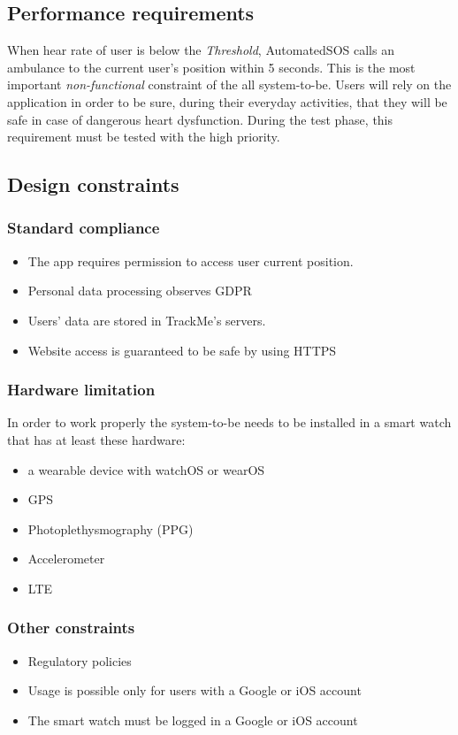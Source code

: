 \documentclass{article}
\begin{document}
\subsection{Performance requirements}
When hear rate of user is below the \emph{Threshold}, AutomatedSOS calls an ambulance to the current user's position within 5 seconds. This is the most important \emph{non-functional} constraint of the all system-to-be. Users will rely on the application in order to be sure, during their everyday activities, that they will be safe in case of dangerous heart dysfunction. During the test phase, this requirement must be tested with the high priority. 
\subsection{Design constraints}
\subsubsection{Standard compliance}
\begin{itemize}
\item The app requires permission to access user current position.
\item Personal data processing observes GDPR
\item Users' data are stored in TrackMe's servers.
\item Website access is guaranteed to be safe by using HTTPS
\end{itemize}
\subsubsection{Hardware limitation}
In order to work properly the system-to-be needs to be installed in a smart watch that has at least these hardware:
\begin{itemize}
\item a wearable device with watchOS or wearOS
\item GPS
\item Photoplethysmography (PPG)
\item Accelerometer
\item LTE
\end{itemize}
\subsubsection{Other constraints}
\begin{itemize}
\item Regulatory policies
\item Usage is possible only for users with a Google or iOS account
\item The smart watch must be logged in a Google or iOS account
\end{itemize}
\end{document}
